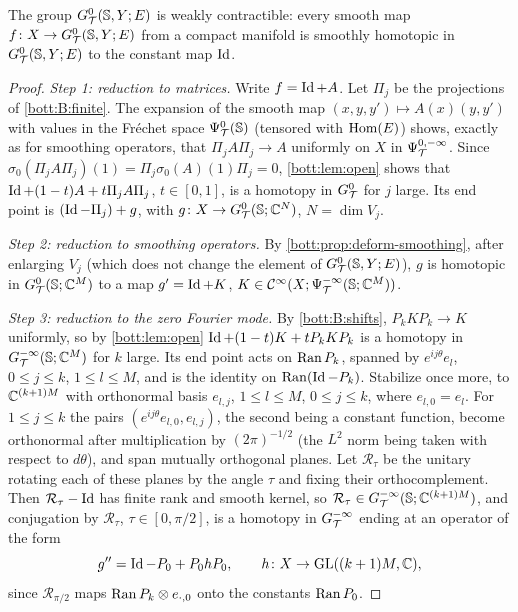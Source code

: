 \begin{theorem}\label{bott:thm:contractible}
  The group $G^{0}_{\mathcal{T}}(\mathbb{S},Y;E)$ is weakly contractible: every smooth map
  $f\colon X\to G^{0}_{\mathcal{T}}(\mathbb{S},Y;E)$ from a compact manifold is smoothly homotopic in
  $G^{0}_{\mathcal{T}}(\mathbb{S},Y;E)$ to the constant map $\operatorname{Id}$.
\end{theorem}
\begin{proof}
  \emph{Step 1: reduction to matrices.} Write $f=\operatorname{Id}+A$. Let $\Pi_j$ be the projections of
  \ref{bott:B:finite}. The expansion of the smooth map $(x,y,y')\mapsto A(x)(y,y')$ with values
  in the Fr\'echet space $\Psi^{0}_{\mathcal{T}}(\mathbb{S})$ (tensored with $\operatorname{Hom}(E)$) shows, exactly as
  for smoothing operators, that $\Pi_jA\Pi_j\to A$ uniformly on $X$ in
  $\Psi^{0,-\infty}_{\mathcal{T}}$. Since $\sigma_0(\Pi_jA\Pi_j)(1)=\Pi_j\sigma_0(A)(1)\Pi_j=0$,
  \cref{bott:lem:open} shows that $\operatorname{Id}+(1-t)A+t\Pi_jA\Pi_j$, $t\in[0,1]$, is a homotopy in
  $G^{0}_{\mathcal{T}}$ for $j$ large. Its end point is $(\operatorname{Id}-\Pi_j)+g$, with
  $g\colon X\to G^{0}_{\mathcal{T}}(\mathbb{S};\mathbb{C}^N)$, $N=\dim V_j$.

  \emph{Step 2: reduction to smoothing operators.} By
  \cref{bott:prop:deform-smoothing}, after enlarging $V_j$ (which does not change the
  element of $G^{0}_{\mathcal{T}}(\mathbb{S},Y;E)$), $g$ is homotopic in $G^{0}_{\mathcal{T}}(\mathbb{S};\mathbb{C}^M)$ to a map
  $g'=\operatorname{Id}+K$, $K\in\mathcal{C}^\infty(X;\Psi^{-\infty}_{\mathcal{T}}(\mathbb{S};\mathbb{C}^M))$.

  \emph{Step 3: reduction to the zero Fourier mode.} By \ref{bott:B:shifts},
  $P_kKP_k\to K$ uniformly, so by \cref{bott:lem:open} $\operatorname{Id}+(1-t)K+tP_kKP_k$ is a homotopy in
  $G^{-\infty}_{\mathcal{T}}(\mathbb{S};\mathbb{C}^M)$ for $k$ large. Its end point acts on $\operatorname{Ran} P_k$, spanned by
  $e^{ij\theta}e_l$, $0\le j\le k$, $1\le l\le M$, and is the identity on $\operatorname{Ran}(\operatorname{Id}-P_k)$.
  Stabilize once more, to $\mathbb{C}^{(k+1)M}$ with orthonormal basis $e_{l,j}$,
  $1\le l\le M$, $0\le j\le k$, where $e_{l,0}=e_l$. For $1\le j\le k$ the pairs
  $(e^{ij\theta}e_{l,0},e_{l,j})$, the second being a constant function, become orthonormal
  after multiplication by $(2\pi)^{-1/2}$ (the $L^2$ norm being taken with respect to
  $d\theta$), and span mutually orthogonal planes. Let $\mathcal R_\tau$ be the unitary rotating each
  of these planes by the angle $\tau$ and fixing their orthocomplement. Then
  $\mathcal R_\tau-\operatorname{Id}$ has finite rank and smooth kernel, so
  $\mathcal R_\tau\in G^{-\infty}_{\mathcal{T}}(\mathbb{S};\mathbb{C}^{(k+1)M})$, and conjugation by $\mathcal R_\tau$,
  $\tau\in[0,\pi/2]$, is a homotopy in $G^{-\infty}_{\mathcal{T}}$ ending at an operator of the form
  \begin{equation*}
    g''=\operatorname{Id}-P_0+P_0hP_0,\qquad h\colon X\to\operatorname{GL}((k+1)M,\mathbb{C}),
  \end{equation*}
  since $\mathcal R_{\pi/2}$ maps $\operatorname{Ran} P_k\otimes e_{\cdot,0}$ onto the constants $\operatorname{Ran} P_0$.


\end{proof}
